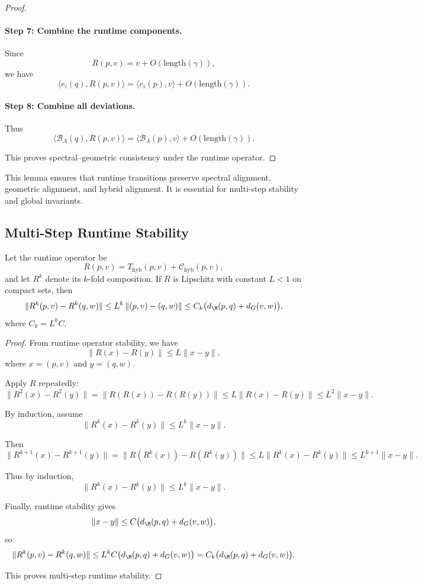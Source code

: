 \begin{proof}
\paragraph{Step 7: Combine the runtime components.}
Since
\[
R(p,v)
=
v + O(\mathrm{length}(\gamma)),
\]
we have
\[
\langle e_i(q), R(p,v) \rangle
=
\langle e_i(p), v \rangle
+ O(\mathrm{length}(\gamma)).
\]

\paragraph{Step 8: Combine all deviations.}
Thus
\[
\langle \mathcal{B}_\Lambda(q), R(p,v) \rangle
=
\langle \mathcal{B}_\Lambda(p), v \rangle
+ O(\mathrm{length}(\gamma)).
\]

This proves spectral--geometric consistency under the runtime operator.
\end{proof}

\begin{remark}
This lemma ensures that runtime transitions preserve spectral alignment,
geometric alignment, and hybrid alignment.  
It is essential for multi-step stability and global invariants.
\end{remark}


\subsection{Multi-Step Runtime Stability}

\begin{lemma}
Let the runtime operator be
\[
R(p,v)
=
T_{\mathrm{hyb}}(p,v)
+
\mathcal{C}_{\mathrm{hyb}}(p,v),
\]
and let $R^k$ denote its $k$-fold composition.  
If $R$ is Lipschitz with constant $L < 1$ on compact sets, then
\[
\|R^k(p,v) - R^k(q,w)\|
\le
L^k\,\| (p,v) - (q,w) \|
\le
C_k\big(d_\M(p,q) + d_G(v,w)\big),
\]
where $C_k = L^k C$.
\end{lemma}

\begin{proof}
From runtime operator stability, we have
\[
\|R(x) - R(y)\| \le L \|x - y\|,
\]
where $x = (p,v)$ and $y = (q,w)$.

Apply $R$ repeatedly:
\[
\|R^2(x) - R^2(y)\|
=
\|R(R(x)) - R(R(y))\|
\le
L \|R(x) - R(y)\|
\le
L^2 \|x - y\|.
\]

By induction, assume
\[
\|R^k(x) - R^k(y)\| \le L^k \|x - y\|.
\]

Then
\[
\|R^{k+1}(x) - R^{k+1}(y)\|
=
\|R(R^k(x)) - R(R^k(y))\|
\le
L \|R^k(x) - R^k(y)\|
\le
L^{k+1} \|x - y\|.
\]

Thus by induction,
\[
\|R^k(x) - R^k(y)\| \le L^k \|x - y\|.
\]

Finally, runtime stability gives
\[
\|x - y\| \le C\big(d_\M(p,q) + d_G(v,w)\big),
\]
so
\[
\|R^k(p,v) - R^k(q,w)\|
\le
L^k C\big(d_\M(p,q) + d_G(v,w)\big)
=
C_k\big(d_\M(p,q) + d_G(v,w)\big).
\]

This proves multi-step runtime stability.
\end{proof}

